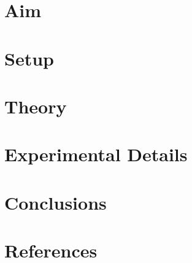 \documentclass{lincolncsuthesis}
\begin{document}
\maketitle

%

%

%

\thesisTables
\thesisBodyStart





\chapter{Aim}


\chapter{Setup}


\chapter{Theory}


\chapter{Experimental Details}


\chapter{Conclusions}


\chapter{References}








\printReferences

\printLudography



%
\end{document}
